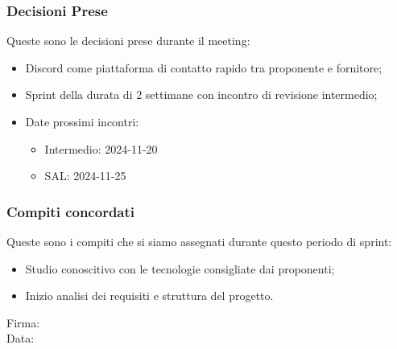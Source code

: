 \documentclass[12pt]{article}
\begin{document}
\subsubsection{Decisioni Prese}
Queste sono le decisioni prese durante il meeting:
\begin{itemize}
	\item Discord come piattaforma di contatto rapido tra proponente e fornitore;
	\item Sprint della durata di 2 settimane con incontro di revisione intermedio;
	\item Date prossimi incontri:
	\begin{itemize}
		\item Intermedio: 2024-11-20
		\item SAL: 2024-11-25
	\end{itemize}
\end{itemize}

\subsubsection{Compiti concordati}
Queste sono i compiti che si siamo assegnati durante questo periodo di sprint:
\begin{itemize}
	\item Studio conoscitivo con le tecnologie consigliate dai proponenti;
	\item Inizio analisi dei requisiti e struttura del progetto.
\end{itemize}

\vfill
\begin{minipage}{10cm}
Firma: \hrulefill \\
\vspace{2mm}
Data: \dotfill
\end{minipage}
\end{document}
